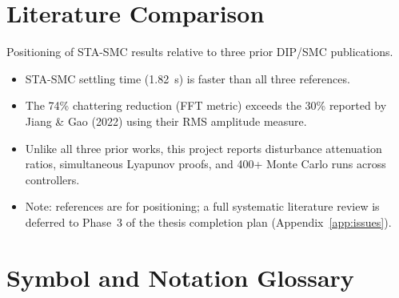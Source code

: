 \documentclass[10pt, a4paper]{article}
\begin{document}
\section{Literature Comparison}
\label{app:litcomp}

Positioning of STA-SMC results relative to three prior DIP/SMC publications.

\begin{center}
\end{center}

\begin{itemize}[leftmargin=1.5em,itemsep=0.2em]
  \item STA-SMC settling time (1.82~s) is faster than all three references.
  \item The 74\% chattering reduction (FFT metric) exceeds the 30\% reported by
  Jiang \& Gao (2022) using their RMS amplitude measure.
  \item Unlike all three prior works, this project reports disturbance attenuation
  ratios, simultaneous Lyapunov proofs, and 400+ Monte Carlo runs across controllers.
  \item Note: references are for positioning; a full systematic literature review
  is deferred to Phase~3 of the thesis completion plan (Appendix~\ref{app:issues}).
\end{itemize}

\section{Symbol and Notation Glossary}
\label{app:glossary}
\end{document}
